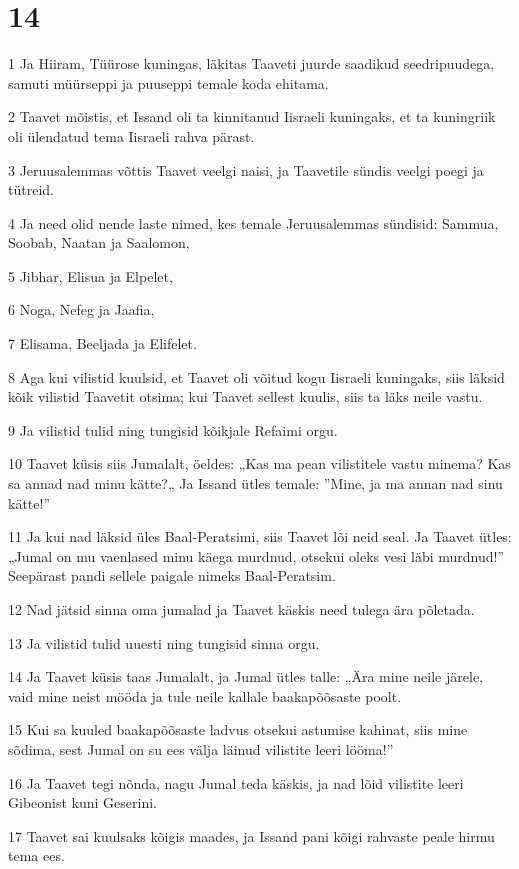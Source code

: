 \chapter{14}

\par 1 Ja Hiiram, Tüürose kuningas, läkitas Taaveti juurde saadikud seedripuudega, samuti müürseppi ja puuseppi temale koda ehitama.
\par 2 Taavet mõistis, et Issand oli ta kinnitanud Iisraeli kuningaks, et ta kuningriik oli ülendatud tema Iisraeli rahva pärast.
\par 3 Jeruusalemmas võttis Taavet veelgi naisi, ja Taavetile sündis veelgi poegi ja tütreid.
\par 4 Ja need olid nende laste nimed, kes temale Jeruusalemmas sündisid: Sammua, Soobab, Naatan ja Saalomon,
\par 5 Jibhar, Elisua ja Elpelet,
\par 6 Noga, Nefeg ja Jaafia,
\par 7 Elisama, Beeljada ja Elifelet.
\par 8 Aga kui vilistid kuulsid, et Taavet oli võitud kogu Iisraeli kuningaks, siis läksid kõik vilistid Taavetit otsima; kui Taavet sellest kuulis, siis ta läks neile vastu.
\par 9 Ja vilistid tulid ning tungisid kõikjale Refaimi orgu.
\par 10 Taavet küsis siis Jumalalt, öeldes: „Kas ma pean vilistitele vastu minema? Kas sa annad nad minu kätte?„ Ja Issand ütles temale: ”Mine, ja ma annan nad sinu kätte!”
\par 11 Ja kui nad läksid üles Baal-Peratsimi, siis Taavet lõi neid seal. Ja Taavet ütles: „Jumal on mu vaenlased minu käega murdnud, otsekui oleks vesi läbi murdnud!” Seepärast pandi sellele paigale nimeks Baal-Peratsim.
\par 12 Nad jätsid sinna oma jumalad ja Taavet käskis need tulega ära põletada.
\par 13 Ja vilistid tulid uuesti ning tungisid sinna orgu.
\par 14 Ja Taavet küsis taas Jumalalt, ja Jumal ütles talle: „Ära mine neile järele, vaid mine neist mööda ja tule neile kallale baakapõõsaste poolt.
\par 15 Kui sa kuuled baakapõõsaste ladvus otsekui astumise kahinat, siis mine sõdima, sest Jumal on su ees välja läinud vilistite leeri lööma!”
\par 16 Ja Taavet tegi nõnda, nagu Jumal teda käskis, ja nad lõid vilistite leeri Gibeonist kuni Geserini.
\par 17 Taavet sai kuulsaks kõigis maades, ja Issand pani kõigi rahvaste peale hirmu tema ees.

